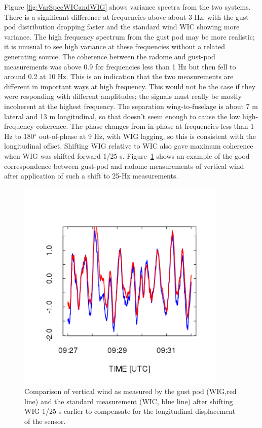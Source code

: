 \documentclass[12pt,twoside,english]{article}\usepackage[]{graphicx}\usepackage[]{color}
\begin{document}
Figure \ref{fig:VarSpecWICandWIG} shows variance spectra from the two systems. There is a significant difference at frequencies above about 3 Hz, with the gust-pod distribution dropping faster and the standard wind WIC showing more variance. The high frequency spectrum from the gust pod may be more realistic; it is unusual to see high variance at these frequencies without a related generating source. The coherence between the radome and gust-pod measurements was above 0.9 for frequencies less than 1 Hz but then fell to around 0.2 at 10 Hz. This is an indication that the two measurements are different in important ways at high frequency. This would not be the case if they were responding with different amplitudes; the signals must really be mostly incoherent at the highest frequency. The separation wing-to-fuselage is about 7 m lateral and 13 m longitudinal, so that doesn't seem enough to cause the low high-frequency coherence. The phase changes from in-phase at frequencies less than 1 Hz to 180$^{\circ}$ out-of-phase at 9 Hz, with WIG lagging, so this is consistent with the longitudinal offset. Shifting WIG relative to WIC also gave maximum coherence when WIG was shifted forward 1/25 s. Figure~\ref{fig:FurtherExpandedWIGshifted} shows an example of the good correspondence between gust-pod and radome measurements of vertical wind after application of such a shift to 25-Hz measurements. 

\begin{figure}
\noindent \begin{centering}
\includegraphics[width=10cm]{SpecialGraphics/GPrf11WIGshiftM1.png}  
\par\end{centering}

\protect\caption{\label{fig:FurtherExpandedWIGshifted}Comparison of vertical wind as measured by the gust pod (WIG,red line) and the standard measurement (WIC, blue line) after shifting WIG 1/25 s earlier to compensate for the longitudinal displacement of the sensor.} 
\end{figure}
\end{document}
